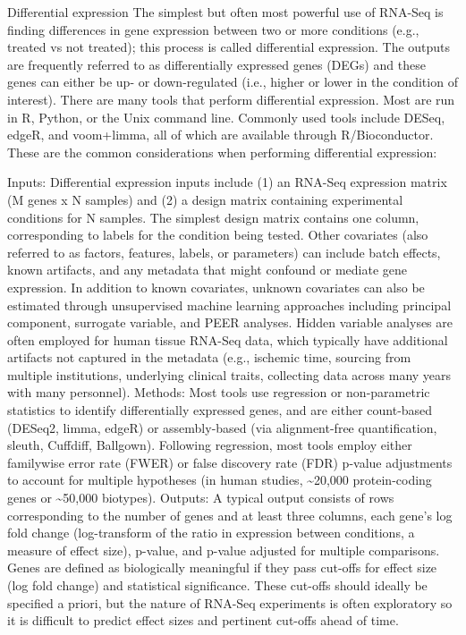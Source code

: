 Differential expression
The simplest but often most powerful use of RNA-Seq is finding differences in gene expression between two or more conditions (e.g., treated vs not treated); this process is called differential expression. The outputs are frequently referred to as differentially expressed genes (DEGs) and these genes can either be up- or down-regulated (i.e., higher or lower in the condition of interest). There are many tools that perform differential expression. Most are run in R, Python, or the Unix command line. Commonly used tools include DESeq, edgeR, and voom+limma, all of which are available through R/Bioconductor. These are the common considerations when performing differential expression:

Inputs: Differential expression inputs include (1) an RNA-Seq expression matrix (M genes x N samples) and (2) a design matrix containing experimental conditions for N samples. The simplest design matrix contains one column, corresponding to labels for the condition being tested. Other covariates (also referred to as factors, features, labels, or parameters) can include batch effects, known artifacts, and any metadata that might confound or mediate gene expression. In addition to known covariates, unknown covariates can also be estimated through unsupervised machine learning approaches including principal component, surrogate variable, and PEER analyses. Hidden variable analyses are often employed for human tissue RNA-Seq data, which typically have additional artifacts not captured in the metadata (e.g., ischemic time, sourcing from multiple institutions, underlying clinical traits, collecting data across many years with many personnel).
Methods: Most tools use regression or non-parametric statistics to identify differentially expressed genes, and are either count-based (DESeq2, limma, edgeR) or assembly-based (via alignment-free quantification, sleuth, Cuffdiff, Ballgown). Following regression, most tools employ either familywise error rate (FWER) or false discovery rate (FDR) p-value adjustments to account for multiple hypotheses (in human studies, \textasciitilde{}20,000 protein-coding genes or \textasciitilde{}50,000 biotypes).
Outputs: A typical output consists of rows corresponding to the number of genes and at least three columns, each gene's log fold change (log-transform of the ratio in expression between conditions, a measure of effect size), p-value, and p-value adjusted for multiple comparisons. Genes are defined as biologically meaningful if they pass cut-offs for effect size (log fold change) and statistical significance. These cut-offs should ideally be specified a priori, but the nature of RNA-Seq experiments is often exploratory so it is difficult to predict effect sizes and pertinent cut-offs ahead of time.
